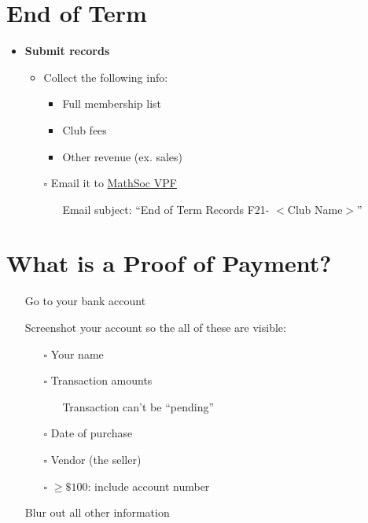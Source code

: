 \documentclass[utf8]{article}
\makeatletter
\renewcommand{\labelitemi}{$\square$}
\renewcommand\labelitemii{\textbullet}
\renewcommand\labelitemiii{$\square$}
\newcommand{\termandyear}{F21}
\newcommand{\MathSocVPF}{\href{mailto:vpf@mathsoc.uwaterloo.ca}{\underline{MathSoc VPF} }}
\makeatother
\begin{document}
\renewcommand{\labelitemi}{$\square$}
\renewcommand\labelitemii{\textbullet}
\renewcommand\labelitemiii{$\square$}
\section*{End of Term}
\begin{itemize}
    \item \textbf{Submit records}
    \begin{itemize}
        \item Collect the following info: 
        \begin{itemize}
            \item Full membership list
            \item Club fees
            \item Other revenue (ex. sales)
        \end{itemize}
        \item[$\square$] Email it to \MathSocVPF
            \begin{itemize}
                \item[\textperiodcentered] Email subject: ``End of Term Records \termandyear - $<$Club Name$>$''
            \end{itemize}
    \end{itemize}
\end{itemize}

\section*{What is a Proof of Payment?}
\label{sec:pop}
\begin{itemize}
    \item[\textbullet] Go to your bank account
    \item[\textbullet] Screenshot your account so the all of these are visible:
    \begin{itemize}
        \item[$\square$] Your name 
        \item[$\square$] Transaction amounts
        \begin{itemize}
            \item[\textperiodcentered] Transaction can't be ``pending''
        \end{itemize} 
        \item[$\square$] Date of purchase
        \item[$\square$] Vendor (the seller) 
        \item[$\square$] $\geq \$100$: include account number 
    \end{itemize}
    \item[\textbullet] Blur out all other information
\end{itemize}
\end{document}
